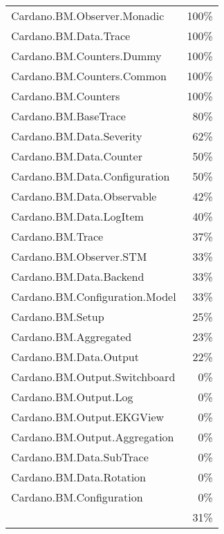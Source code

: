 \begin{tabular}{l r}
   Cardano.BM.Observer.Monadic & 100\% \\
   Cardano.BM.Data.Trace & 100\% \\
   Cardano.BM.Counters.Dummy & 100\% \\
   Cardano.BM.Counters.Common & 100\% \\
   Cardano.BM.Counters & 100\% \\
   Cardano.BM.BaseTrace & 80\% \\
   Cardano.BM.Data.Severity & 62\% \\
   Cardano.BM.Data.Counter & 50\% \\
   Cardano.BM.Data.Configuration & 50\% \\
   Cardano.BM.Data.Observable & 42\% \\
   Cardano.BM.Data.LogItem & 40\% \\
   Cardano.BM.Trace & 37\% \\
   Cardano.BM.Observer.STM & 33\% \\
   Cardano.BM.Data.Backend & 33\% \\
   Cardano.BM.Configuration.Model & 33\% \\
   Cardano.BM.Setup & 25\% \\
   Cardano.BM.Aggregated & 23\% \\
   Cardano.BM.Data.Output & 22\% \\
   Cardano.BM.Output.Switchboard & 0\% \\
   Cardano.BM.Output.Log & 0\% \\
   Cardano.BM.Output.EKGView & 0\% \\
   Cardano.BM.Output.Aggregation & 0\% \\
   Cardano.BM.Data.SubTrace & 0\% \\
   Cardano.BM.Data.Rotation & 0\% \\
   Cardano.BM.Configuration & 0\% \\
    & 31\% \\
\end{tabular}
